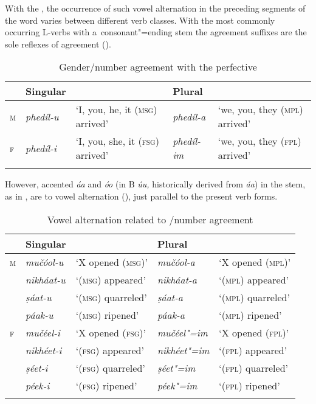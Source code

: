 With the , the occurrence of such vowel alternation in the preceding segments of the word varies between different verb classes. With the most commonly occurring L-verbs with a~consonant"=ending stem the agreement suffixes are the sole reflexes of agreement ().


\begin{table}[p]
\caption{Gender/number agreement with the perfective}

\begin{tabularx}{\textwidth}{ l l Q l Q }
\lsptoprule
&
Singular &
&
Plural &
\\\midrule
\textsc{m} &
\textit{phedíl-u} &
`I, you, he, it (\textsc{msg}) arrived' &
\textit{phedíl-a} &
`we, you, they (\textsc{mpl}) arrived'\\
\textsc{f} &
\textit{phedíl-i} &
`I, you, she, it (\textsc{fsg}) arrived' &
\textit{phedíl-im} &
`we, you, they (\textsc{fpl}) arrived'\\\lspbottomrule
\end{tabularx}
\label{tab:8-19}
\end{table}


However, accented \textit{áa} and \textit{óo} (in B \textit{úu,} historically derived from \textit{áa}) in the  stem, as in , are  to vowel alternation (), just parallel to the present verb forms. 


\begin{table}[p]
\caption{Vowel alternation related to /number agreement}

\begin{tabularx}{\textwidth}{ l l@{\hspace{20pt}} l@{\hspace{20pt}} l@{\hspace{20pt}} l@{\hspace{20pt}} }
\lsptoprule
&
Singular &
&
Plural &
\\\midrule
\textsc{m} &
\textit{mučóol-u} &
`X opened (\textsc{msg})' &
\textit{mučóol-a} &
`X opened (\textsc{mpl})'\\
&
\textit{nikháat-u} &
`(\textsc{msg}) appeared' &
\textit{nikháat-a} &
`(\textsc{mpl}) appeared'\\
&
\textit{ṣáat-u} &
`(\textsc{msg}) quarreled' &
\textit{ṣáat-a} &
`(\textsc{mpl}) quarreled'\\
&
\textit{páak-u} &
`(\textsc{msg}) ripened' &
\textit{páak-a} &
`(\textsc{mpl}) ripened'\\
\textsc{f} &
\textit{mučéel-i} &
`X opened (\textsc{fsg})' &
\textit{mučéel"=im} &
`X opened (\textsc{fpl})'\\
&
\textit{nikhéet-i} &
`(\textsc{fsg}) appeared' &
\textit{nikhéet"=im} &
`(\textsc{fpl}) appeared'\\
&
\textit{ṣéet-i} &
`(\textsc{fsg}) quarreled' &
\textit{ṣéet"=im} &
`(\textsc{fpl}) quarreled'\\
&
\textit{péek-i} &
`(\textsc{fsg}) ripened' &
\textit{péek"=im} &
`(\textsc{fpl}) ripened'\\\lspbottomrule
\end{tabularx}
\label{tab:8-20}
\end{table}


